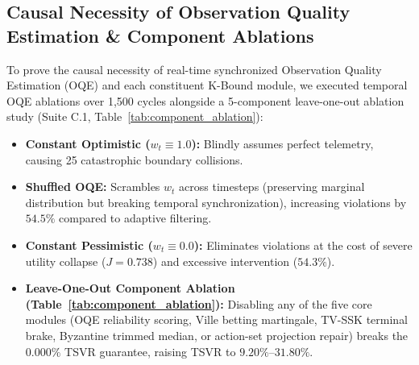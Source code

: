 \documentclass[conference]{IEEEtran}
\begin{document}
\subsection{Causal Necessity of Observation Quality Estimation \& Component Ablations}
To prove the causal necessity of real-time synchronized Observation Quality Estimation (OQE) and each constituent K-Bound module, we executed temporal OQE ablations over 1,500 cycles alongside a 5-component leave-one-out ablation study (Suite C.1, Table~\ref{tab:component_ablation}):
\begin{itemize}
    \item \textbf{Constant Optimistic ($w_t \equiv 1.0$):} Blindly assumes perfect telemetry, causing 25 catastrophic boundary collisions.
    \item \textbf{Shuffled OQE:} Scrambles $w_t$ across timesteps (preserving marginal distribution but breaking temporal synchronization), increasing violations by $54.5\%$ compared to adaptive filtering.
    \item \textbf{Constant Pessimistic ($w_t \equiv 0.0$):} Eliminates violations at the cost of severe utility collapse ($J = 0.738$) and excessive intervention ($54.3\%$).
    \item \textbf{Leave-One-Out Component Ablation (Table~\ref{tab:component_ablation}):} Disabling any of the five core modules (OQE reliability scoring, Ville betting martingale, TV-SSK terminal brake, Byzantine trimmed median, or action-set projection repair) breaks the $0.000\%$ TSVR guarantee, raising TSVR to $9.20\%$--$31.80\%$.
\end{itemize}

\begin{table}[ht]
\caption{Suite C.1 Leave-One-Out Component Ablation under Compound Faults}
\label{tab:component_ablation}
\centering
{}
\end{table}
\end{document}
